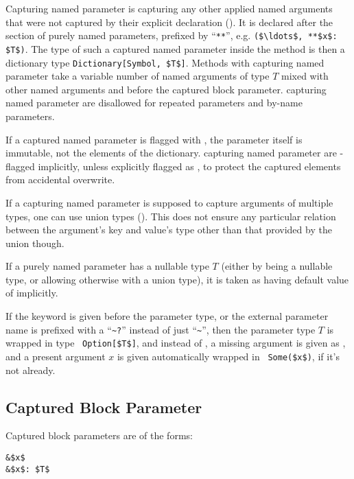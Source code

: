 Capturing named parameter is capturing any other applied named arguments that were not captured by their explicit declaration (). It is declared after the section of purely named parameters, prefixed by ``\lstinline!**!'', e.g. \lstinline!($\ldots$, **$x$: $T$)!. The type of such a captured named parameter inside the method is then a dictionary type \lstinline!Dictionary[Symbol, $T$]!. Methods with capturing named parameter take a variable number of named arguments of type $T$ mixed with other named arguments and before the captured block parameter. capturing named parameter are disallowed for repeated parameters and by-name parameters. 

If a captured named parameter is flagged with , the parameter itself is immutable, not the elements of the dictionary. capturing named parameter are -flagged implicitly, unless explicitly flagged as , to protect the captured elements from accidental overwrite. 

If a capturing named parameter is supposed to capture arguments of multiple types, one can use union types (). This does not ensure any particular relation between the argument's key and value's type other than that provided by the union though.

If a purely named parameter has a nullable type $T$ (either by being a nullable type, or allowing otherwise  with a union type), it is taken as having default value of  implicitly. 


If the keyword  is given before the parameter type, or the external parameter name is prefixed with a ``\lstinline!~?!'' instead of just ``\lstinline!~!'', then the parameter type $T$ is wrapped in type ~\lstinline!Option[$T$]!, and instead of , a missing argument is given as , and a present argument $x$ is given automatically wrapped in ~\lstinline!Some($x$)!, if it's not already. 





\subsection{Captured Block Parameter}
\label{sec:captured-block-parameter}

Captured block parameters are of the forms:
\begin{lstlisting}
&$x$
&$x$: $T$
\end{lstlisting}

